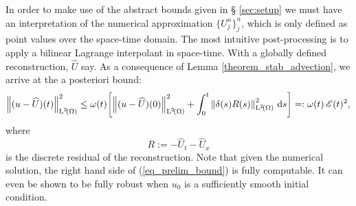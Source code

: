 \documentclass[final]{amsart}
\renewcommand{\d}{\ensuremath{\,\mathrm{d}}}
\numberwithin{equation}{section}
\begin{document}
In order to make use of the abstract bounds given in \S
\ref{sec:setup} we must have an interpretation of the numerical
approximation $\{ U^n_j \}_{j}^{n}$, which is only defined as point
values over the space-time domain. The most intuitive post-processing
is to apply a bilinear Lagrange interpolant in space-time. With a
globally defined reconstruction, $\widehat U$ say. As a consequence of
Lemma \ref{theorem_stab_advection}, we arrive at the a posteriori
bound:
\begin{equation}\label{eq_prelim_bound}
\Norm{(u - \widehat{U})\qp{t}}^2_{\leb{2}\qp{\W}}
\leq
\w(t)
\qb{\Norm{(u - \widehat{U})\qp{0}}^2_{\leb{2}\qp{\W}}+\int_0^t\Norm{\delta(s) R(s)}^2_{\leb{2}\qp{\W}}  \d s }
=: \w\qp{t}\cE(t)^2
,
\end{equation}
where
\begin{equation}
R := - \widehat U_t - \widehat U_x
\end{equation}
is the discrete residual of the reconstruction. Note that given the
numerical solution, the right hand side of (\ref{eq_prelim_bound}) is
fully computable. It can even be shown to be fully robust when $u_0$
is a sufficiently smooth initial condition.
\end{document}

